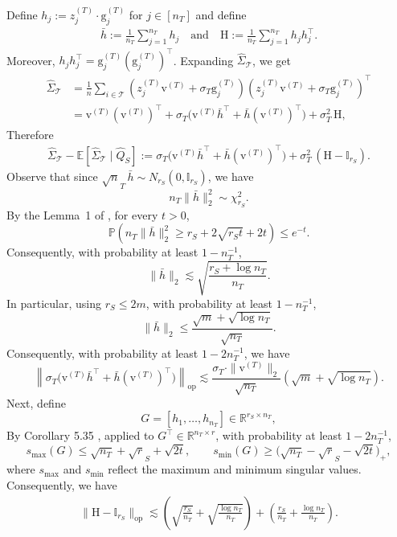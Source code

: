 \documentclass[10pt]{article}
\newcommand{\R}{\mathbb R}
\newcommand{\Ebb}{\mathbb E}
\newcommand{\op}{\mathrm{op}}
\newcommand{\Id}{\mathbb I}
\newcommand{\wh}{\widehat}
\newcommand{\calT}{\mathcal T}
\newcommand{\trg}{T}
\newcommand{\nT}{n_{\trg}}
\newcommand{\sigmaT}{\sigma_{\trg}}
\newcommand{\ztar}{z^{(\trg)}}
\newcommand{\rmqv}{\mathrm{v}^{(\trg)}}
\newcommand{\rmqg}{\mathrm{g}^{(\trg)}}
\newcommand{\src}{S}
\begin{document}
Define $h_j:=\ztar_j\cdot\rmqg_j$ for $j \in [\nT]$ and define
\begin{align}
\label{eq:def_h_bar_rm_h}
    \bar{h}:=\frac{1}{\nT}\sum_{j =1}^{\nT}h_j \quad \mbox{and} \quad \mathrm H:=\frac{1}{\nT}\sum_{j =1}^{\nT}h_jh_j^\top.
\end{align}
Moreover, $h_jh_j^\top=\rmqg_j(\rmqg_j)^\top$. Expanding $\wh\Sigma_{\calT}$, we get
\begin{align}
    \wh\Sigma_{\calT}
    &=\frac1n\sum_{i \in \calT}(\ztar_j\rmqv+\sigmaT \rmqg_j)(\ztar_j\rmqv+\sigmaT \rmqg_j)^\top\\
    &=\rmqv(\rmqv)^\top+\sigmaT\bigl(\rmqv\bar{ h}^\top+\bar{h} (\rmqv)^\top\bigr)+\sigmaT^2\,\mathrm H,
\end{align}
Therefore
\begin{align}
   \wh\Sigma_{\calT}- \Ebb[\wh\Sigma_{\calT}\mid\wh Q_\src]:=\sigmaT\bigl(\rmqv\bar{ h}^\top+\bar{h} (\rmqv)^\top\bigr)+\sigmaT^2\,(\mathrm H-\Id_{r_\src}).
\end{align}
Observe that since $\sqrt \nT\,\bar h\sim N_{r_\src}(0,\Id_{r_\src})$, we have
\[
    \nT\|\bar h\|_2^2 \sim \chi_{r_\src}^2 .
\]
By the Lemma~1 of \cite{laurent2000adaptive}, for every $t>0$,
\[
\mathbb P\left(\nT\|\bar h\|_2^2\ge r_\src+2\sqrt{r_\src t}+2t\right) \le e^{-t}.
\]
Consequently, with probability at least $1-\nT^{-1}$,
\begin{equation}
\label{eq:hbar_bound}
\|\bar h\|_2 \lesssim \sqrt{\frac{r_\src+\log \nT}{\nT}}.
\end{equation}
In particular, using $r_\src\le 2m$, with probability at least $1-\nT^{-1}$,
\[
\|\bar h\|_2 \le \frac{\sqrt{m}+\sqrt{\log \nT}}{\sqrt{\nT}}.
\]
Consequently, with probability at least $1-2\nT^{-1}$, we have
\[
\left\|\sigmaT\bigl(\rmqv\bar{ h}^\top+\bar{h} (\rmqv)^\top\bigr)\right\|_{\op} \lesssim \frac{\sigmaT \cdot \|\rmqv\|_2}{\sqrt{\nT}}\left(\sqrt{m}+\sqrt{\log \nT}\right).
\]
Next, define
\[
G=[h_1,\ldots,h_{\nT}]\in\R^{r_\src\times \nT},
\]
By Corollary 5.35 \cite{vershynin2012introduction}, applied to $G^\top\in\R^{\nT\times r}$, with probability at least
$1-2\nT^{-1}$,
\[
    s_{\max}(G)\le \sqrt{\nT}+\sqrt r_\src+\sqrt{2t},
    \qquad
    s_{\min}(G)\ge \bigl(\sqrt{\nT}-\sqrt r_\src-\sqrt{2t}\bigr)_+ ,
\]
where $s_{\max}$ and $s_{\min}$ reflect the maximum and minimum singular values.
Consequently, we have
\begin{align}
\label{eq:covariance_bounds}
    \|\mathrm H-\Id_{r_\src}\|_{\op}\lesssim \left(\sqrt{\frac{r_\src}{\nT}}+\sqrt{\frac{\log\nT}{\nT}}\right)+\left(\frac{r_\src}{\nT}+\frac{\log\nT}{\nT}\right).
\end{align}
\end{document}
